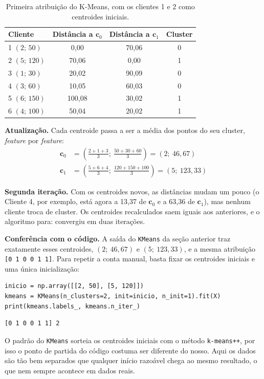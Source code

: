 \documentclass[a4paper,12pt,openany]{book}
\begin{document}
\begin{table}[H]
\centering
\begin{tabular}{lccc}
\toprule
\textbf{Cliente} & \textbf{Distância a \(\mathbf{c}_0\)} & \textbf{Distância a \(\mathbf{c}_1\)} & \textbf{Cluster} \\
\midrule
1 \((2;\,50)\)   & 0,00   & 70,06 & 0 \\
2 \((5;\,120)\)  & 70,06  & 0,00  & 1 \\
3 \((1;\,30)\)   & 20,02  & 90,09 & 0 \\
4 \((3;\,60)\)   & 10,05  & 60,03 & 0 \\
5 \((6;\,150)\)  & 100,08 & 30,02 & 1 \\
6 \((4;\,100)\)  & 50,04  & 20,02 & 1 \\
\bottomrule
\end{tabular}
\caption{Primeira atribuição do K-Means, com os clientes 1 e 2 como centroides iniciais.}
\label{tab:kmeans_atribuicao}
\end{table}

\textbf{Atualização.} Cada centroide passa a ser a média dos pontos do seu cluster, \textit{feature} por \textit{feature}:
\begin{align}
\mathbf{c}_0 &= \left(\frac{2+1+3}{3};\ \frac{50+30+60}{3}\right) = (2;\ 46{,}67) \\
\mathbf{c}_1 &= \left(\frac{5+6+4}{3};\ \frac{120+150+100}{3}\right) = (5;\ 123{,}33)
\end{align}

\textbf{Segunda iteração.} Com os centroides novos, as distâncias mudam um pouco (o Cliente 4, por exemplo, está agora a 13,37 de \(\mathbf{c}_0\) e a 63,36 de \(\mathbf{c}_1\)), mas nenhum cliente troca de cluster. Os centroides recalculados saem iguais aos anteriores, e o algoritmo para: convergiu em duas iterações.

\textbf{Conferência com o código.} A saída do \texttt{KMeans} da seção anterior traz exatamente esses centroides, \((2;\ 46{,}67)\) e \((5;\ 123{,}33)\), e a mesma atribuição \texttt{[0 1 0 0 1 1]}. Para repetir a conta manual, basta fixar os centroides iniciais e uma única inicialização:
\begin{verbatim}
inicio = np.array([[2, 50], [5, 120]])
kmeans = KMeans(n_clusters=2, init=inicio, n_init=1).fit(X)
print(kmeans.labels_, kmeans.n_iter_)
\end{verbatim}
\begin{verbatim}
[0 1 0 0 1 1] 2
\end{verbatim}
O padrão do \texttt{KMeans} sorteia os centroides iniciais com o método \texttt{k-means++}, por isso o ponto de partida do código costuma ser diferente do nosso. Aqui os dados são tão bem separados que qualquer início razoável chega ao mesmo resultado, o que nem sempre acontece em dados reais.
\end{document}

